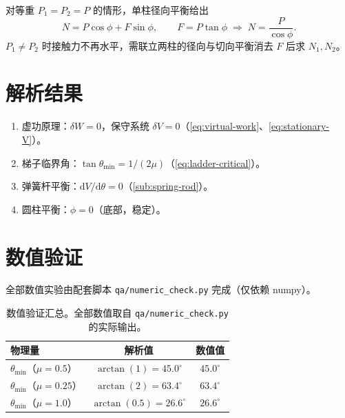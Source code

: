 \documentclass[UTF8,a4paper,11pt]{ctexart}
\begin{document}
对等重 $P_1=P_2=P$ 的情形，单柱径向平衡给出
\begin{equation}
  N=P\cos\phi+F\sin\phi,\qquad F=P\tan\phi
  \;\Longrightarrow\;
  N=\frac{P}{\cos\phi}.
\end{equation}
$P_1\ne P_2$ 时接触力不再水平，需联立两柱的径向与切向平衡消去 $F$ 后求 $N_1,N_2$。

\section{解析结果}
\label{sec:result}

\begin{enumerate}
  \item 虚功原理：$\delta W=0$，保守系统 $\delta V=0$（\eqref{eq:virtual-work}、\eqref{eq:stationary-V}）。
  \item 梯子临界角：$\tan\theta_{\min}=1/(2\mu)$（\eqref{eq:ladder-critical}）。
  \item 弹簧杆平衡：$\mathrm dV/\mathrm d\theta=0$（\eqref{sub:spring-rod}）。
  \item 圆柱平衡：$\phi=0$（底部，稳定）。
\end{enumerate}

\section{数值验证}
\label{sec:numeric}

全部数值实验由配套脚本 \texttt{qa/numeric\_check.py} 完成（仅依赖 numpy）。

\begin{table}[htbp]
\centering
\small
\begin{tabular}{p{5cm}cc}
\toprule
物理量 & 解析值 & 数值值 \\
\midrule
$\theta_{\min}$（$\mu=0.5$） & $\arctan(1)=45.0^\circ$ & $45.0^\circ$ \\
$\theta_{\min}$（$\mu=0.25$） & $\arctan(2)=63.4^\circ$ & $63.4^\circ$ \\
$\theta_{\min}$（$\mu=1.0$） & $\arctan(0.5)=26.6^\circ$ & $26.6^\circ$ \\
\bottomrule
\end{tabular}
\caption{数值验证汇总。全部数值取自 \texttt{qa/numeric\_check.py} 的实际输出。}
\label{tab:numeric}
\end{table}

\end{document}
